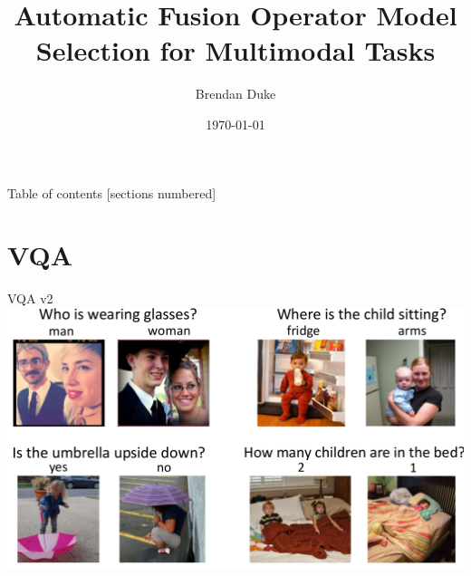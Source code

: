 \documentclass{beamer}
\title{Automatic Fusion Operator Model Selection for Multimodal Tasks}
\date{\today}
\author{Brendan Duke}
\institute{University of Guelph}
\begin{document}
\maketitle

\begin{frame}{Table of contents}
  [sections numbered]
  \tableofcontents[hideallsubsections]
\end{frame}







\section{VQA}

{%
\begin{frame}{VQA v2}
        \center{}
        \hspace*{-2mm}
        \includegraphics[scale=0.31]{data/vqa2-balanced-imgs}
\end{frame}
}
\end{document}
